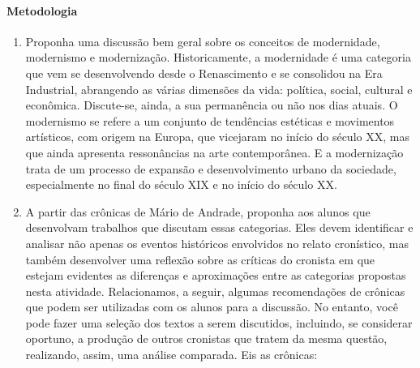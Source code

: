 \documentclass[12pt]{extarticle}
\begin{document}





\paragraph{Metodologia} 

\begin{enumerate}

\item
Proponha uma discussão bem geral sobre os
conceitos de modernidade, modernismo e modernização. Historicamente, a
modernidade é uma categoria que vem se desenvolvendo desde o
Renascimento e se consolidou na Era Industrial, abrangendo as várias
dimensões da vida: política, social, cultural e econômica. Discute-se,
ainda, a sua permanência ou não nos dias atuais. O modernismo se refere
a um conjunto de tendências estéticas e movimentos artísticos, com
origem na Europa, que vicejaram no início do século XX, mas que ainda
apresenta ressonâncias na arte contemporânea. E a modernização trata de
um processo de expansão e desenvolvimento urbano da sociedade,
especialmente no final do século XIX e no início do século XX.






\item
A partir das crônicas de Mário de Andrade, proponha aos alunos que
desenvolvam trabalhos que discutam essas categorias. Eles devem
identificar e analisar não apenas os eventos históricos envolvidos no
relato cronístico, mas também desenvolver uma reflexão sobre as críticas
do cronista em que estejam evidentes as diferenças e aproximações entre
as categorias propostas nesta atividade. Relacionamos, a seguir, algumas
recomendações de crônicas que podem ser utilizadas com os alunos para a
discussão. No entanto, você pode fazer uma seleção dos textos a serem
discutidos, incluindo, se considerar oportuno, a produção de outros
cronistas que tratem da mesma questão, realizando, assim, uma análise
comparada. Eis as crônicas:


\end{enumerate}
\end{document}
